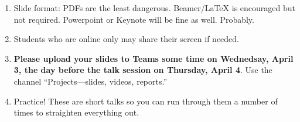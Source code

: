 \begin{enumerate}
\item
  Slide format: PDFs are the least dangerous.
  Beamer/LaTeX is encouraged but not required.
  Powerpoint or Keynote will be fine as well. Probably.

\item
  Students who are online only may share their screen if needed.

\item

  \textbf{Please upload your slides to Teams some time on Wednedsay, April 3, the day before the talk session on Thursday, April 4}.
  Use the channel ``Projects---slides, videos, reports.''

\item
  Practice!  These are short talks so you can run through
  them a number of times to straighten everything out.


\end{enumerate}

